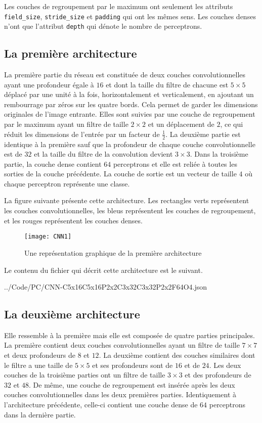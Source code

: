 Les couches de regroupement par le maximum ont seulement les attributs \texttt{field\_size},
\texttt{stride\_size} et \texttt{padding} qui ont les mêmes sens. Les couches denses
n'ont que l'attribut \texttt{depth} qui dénote le nombre de perceptrons.

\subsection{La première architecture}

La première partie du réseau est constituée de deux couches convolutionnelles
ayant une profondeur égale à $16$ et dont la taille du filtre de chacune est
$5 \times 5$ déplacé par une unité à la fois, horizontalement et verticalement,
en ajoutant un rembourrage par zéros sur les quatre bords. Cela permet de garder
les dimensions originales de l'image entrante.
Elles sont suivies par une couche de regroupement par le maximum ayant un filtre
de taille $2 \times 2$ et un déplacement de $2$, ce qui réduit les dimensions de
l'entrée par un facteur de $\frac{1}{2}$. La deuxième partie est
identique à la première sauf que la profondeur de chaque couche convolutionnelle
est de $32$ et la taille du filtre de la convolution devient $3 \times 3$. Dans la
troisième partie, la couche dense contient $64$ perceptrons et elle est reliée
à toutes les sorties de la couche précédente. La couche de sortie est un
vecteur de taille $4$ où chaque perceptron représente une classe.

La figure suivante présente cette architecture. Les rectangles verts représentent
les couches convolutionnelles, les bleus représentent les couches de regroupement,
et les rouges représentent les couches denses.

\begin{figure}[h]
  \centering
  \texttt{[image: CNN1]}
  \caption{Une représentation graphique de la première architecture}
\end{figure}

Le contenu du fichier qui décrit cette architecture est le suivant.

{../Code/PC/CNN-C5x16C5x16P2x2C3x32C3x32P2x2F64O4.json}

\subsection{La deuxième architecture}

Elle ressemble à la première mais elle est composée de quatre
parties principales. La première contient deux couches convolutionnelles ayant
un filtre de taille $7 \times 7$ et deux profondeurs de $8$ et $12$.
La deuxième contient des couches similaires dont le filtre a une taille de $5 \times 5$
et ses profondeurs sont de $16$ et de $24$. Les deux couches de la troisième parties ont
un filtre de taille $3 \times 3$ et des profondeurs de $32$ et $48$.
De même, une couche de regroupement est insérée après les deux couches
convolutionnelles dans les deux premières parties. Identiquement à l'architecture
précédente, celle-ci contient une couche dense de $64$ perceptrons dans la
dernière partie.

